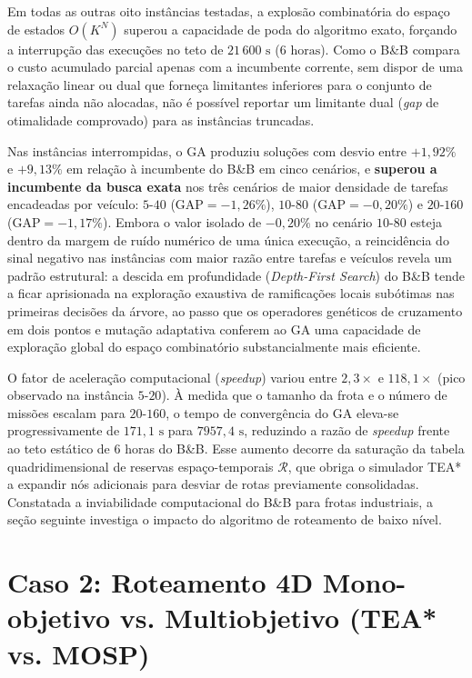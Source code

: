 Em todas as outras oito instâncias testadas, a explosão combinatória do espaço de estados $O(K^N)$ superou a capacidade de poda do algoritmo exato, forçando a interrupção das execuções no teto de $21\,600\text{ s}$ ($6\text{ horas}$). Como o B\&B compara o custo acumulado parcial apenas com a incumbente corrente, sem dispor de uma relaxação linear ou dual que forneça limitantes inferiores para o conjunto de tarefas ainda não alocadas, não é possível reportar um limitante dual (\textit{gap} de otimalidade comprovado) para as instâncias truncadas.

Nas instâncias interrompidas, o GA produziu soluções com desvio entre $+1{,}92\%$ e $+9{,}13\%$ em relação à incumbente do B\&B em cinco cenários, e \textbf{superou a incumbente da busca exata} nos três cenários de maior densidade de tarefas encadeadas por veículo: $5\text{-}40$ ($\text{GAP} = -1{,}26\%$), $10\text{-}80$ ($\text{GAP} = -0{,}20\%$) e $20\text{-}160$ ($\text{GAP} = -1{,}17\%$). Embora o valor isolado de $-0{,}20\%$ no cenário $10\text{-}80$ esteja dentro da margem de ruído numérico de uma única execução, a reincidência do sinal negativo nas instâncias com maior razão entre tarefas e veículos revela um padrão estrutural: a descida em profundidade (\textit{Depth-First Search}) do B\&B tende a ficar aprisionada na exploração exaustiva de ramificações locais subótimas nas primeiras decisões da árvore, ao passo que os operadores genéticos de cruzamento em dois pontos e mutação adaptativa conferem ao GA uma capacidade de exploração global do espaço combinatório substancialmente mais eficiente.

O fator de aceleração computacional (\textit{speedup}) variou entre $2{,}3\times$ e $118{,}1\times$ (pico observado na instância $5\text{-}20$). À medida que o tamanho da frota e o número de missões escalam para $20\text{-}160$, o tempo de convergência do GA eleva-se progressivamente de $171{,}1\text{ s}$ para $7957{,}4\text{ s}$, reduzindo a razão de \textit{speedup} frente ao teto estático de 6 horas do B\&B. Esse aumento decorre da saturação da tabela quadridimensional de reservas espaço-temporais $\mathcal{R}$, que obriga o simulador TEA* a expandir nós adicionais para desviar de rotas previamente consolidadas. Constatada a inviabilidade computacional do B\&B para frotas industriais, a seção seguinte investiga o impacto do algoritmo de roteamento de baixo nível.

\section{Caso 2: Roteamento 4D Mono-objetivo vs. Multiobjetivo (TEA* vs. MOSP)}\label{sec:caso2}

